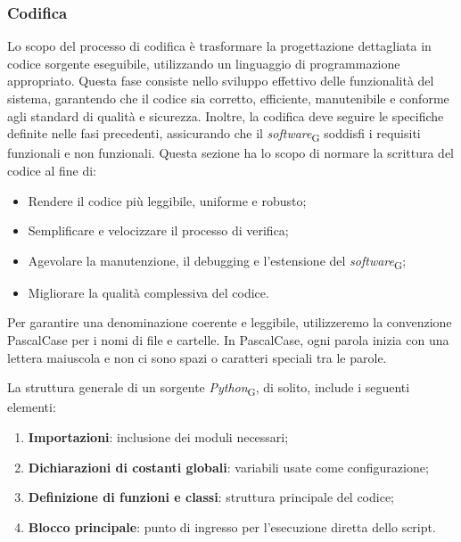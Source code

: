 \subsubsection{Codifica}
Lo scopo del processo di codifica è trasformare la progettazione dettagliata in codice sorgente eseguibile, utilizzando un linguaggio di programmazione appropriato. Questa fase consiste nello sviluppo effettivo delle funzionalità del sistema, garantendo che il codice sia corretto, efficiente, manutenibile e conforme agli standard di qualità e sicurezza. Inoltre, la codifica deve seguire le specifiche definite nelle fasi precedenti, assicurando che il \textit{software}\textsubscript{G} soddisfi i requisiti funzionali e non funzionali. Questa sezione ha lo scopo di normare la scrittura del codice al fine di:
\begin{itemize}
    \item Rendere il codice più leggibile, uniforme e robusto;
    \item Semplificare e velocizzare il processo di verifica;
    \item Agevolare la manutenzione, il debugging e l'estensione del \textit{software}\textsubscript{G};
    \item Migliorare la qualità complessiva del codice.
\end{itemize}

Per garantire una denominazione coerente e leggibile, utilizzeremo la convenzione PascalCase per i nomi di file e cartelle. In PascalCase, ogni parola inizia con una lettera maiuscola e non ci sono spazi o caratteri speciali tra le parole.

La struttura generale di un sorgente \textit{Python}\textsubscript{G}, di solito, include i seguenti elementi:
\begin{enumerate}
    \item \textbf{Importazioni}: inclusione dei moduli necessari;
    \item \textbf{Dichiarazioni di costanti globali}: variabili usate come configurazione;
    \item \textbf{Definizione di funzioni e classi}: struttura principale del codice;
    \item \textbf{Blocco principale}: punto di ingresso per l'esecuzione diretta dello script.
\end{enumerate}

